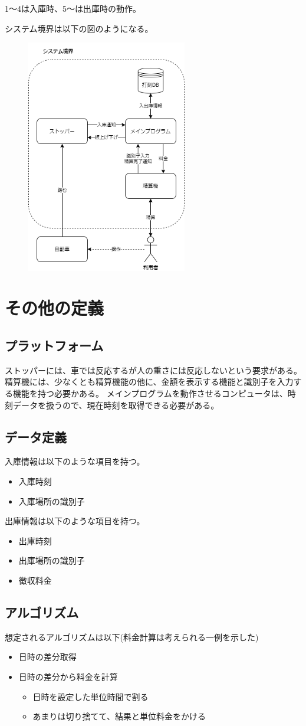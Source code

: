 \documentclass[a4paper,10pt]{jsarticle}
\begin{document}
1～4は入庫時、5～は出庫時の動作。

システム境界は以下の図のようになる。
\begin{figure}[H]
  \centering
  \includegraphics[width=7cm]{01.png}
\end{figure}

\section{その他の定義}
\subsection{プラットフォーム}
ストッパーには、車では反応するが人の重さには反応しないという要求がある。
精算機には、少なくとも精算機能の他に、金額を表示する機能と識別子を入力する機能を持つ必要かある。
メインプログラムを動作させるコンピュータは、時刻データを扱うので、現在時刻を取得できる必要がある。

\subsection{データ定義}
入庫情報は以下のような項目を持つ。
\begin{itemize}
  \item 入庫時刻
  \item 入庫場所の識別子
\end{itemize}

出庫情報は以下のような項目を持つ。
\begin{itemize}
  \item 出庫時刻
  \item 出庫場所の識別子
  \item 徴収料金
\end{itemize}

\subsection{アルゴリズム}
想定されるアルゴリズムは以下(料金計算は考えられる一例を示した)
\begin{itemize}
  \item 日時の差分取得
  \item 日時の差分から料金を計算
  \begin{itemize}
    \item 日時を設定した単位時間で割る
    \item あまりは切り捨てて、結果と単位料金をかける
  \end{itemize}
\end{itemize}
\end{document}
